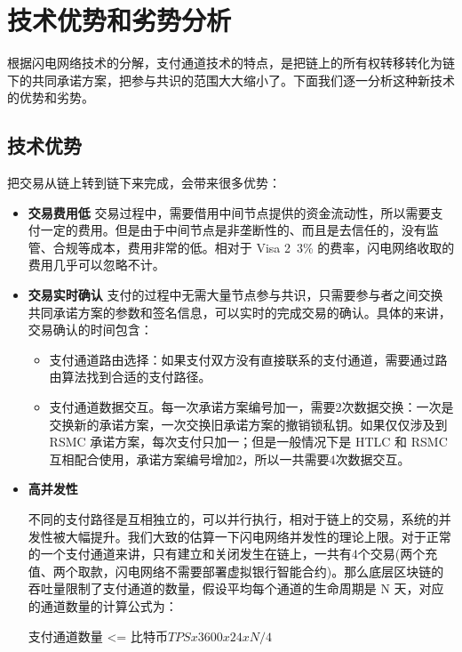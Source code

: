 \section{技术优势和劣势分析}
根据闪电网络技术的分解，支付通道技术的特点，是把链上的所有权转移转化为链下的共同承诺方案，把参与共识的范围大大缩小了。下面我们逐一分析这种新技术的优势和劣势。

\subsection{技术优势}
把交易从链上转到链下来完成，会带来很多优势：

\begin{itemize}
    \item  \textbf{交易费用低}
        交易过程中，需要借用中间节点提供的资金流动性，所以需要支付一定的费用。但是由于中间节点是非垄断性的、而且是去信任的，没有监管、合规等成本，费用非常的低。相对于 Visa 2~3\% 的费率，闪电网络收取的费用几乎可以忽略不计。
        
    \item \textbf{交易实时确认}
        支付的过程中无需大量节点参与共识，只需要参与者之间交换共同承诺方案的参数和签名信息，可以实时的完成交易的确认。具体的来讲，交易确认的时间包含：
        \begin{itemize}
            \item 支付通道路由选择：如果支付双方没有直接联系的支付通道，需要通过路由算法找到合适的支付路径。
            \item 支付通道数据交互。每一次承诺方案编号加一，需要2次数据交换：一次是交换新的承诺方案，一次交换旧承诺方案的撤销锁私钥。如果仅仅涉及到 RSMC 承诺方案，每次支付只加一；但是一般情况下是 HTLC 和 RSMC 互相配合使用，承诺方案编号增加2，所以一共需要4次数据交互。
            
        \end{itemize}
        

      \item \textbf{高并发性}

        不同的支付路径是互相独立的，可以并行执行，相对于链上的交易，系统的并发性被大幅提升。我们大致的估算一下闪电网络并发性的理论上限。对于正常的一个支付通道来讲，只有建立和关闭发生在链上，一共有4个交易(两个充值、两个取款，闪电网络不需要部署虚拟银行智能合约)。那么底层区块链的吞吐量限制了支付通道的数量，假设平均每个通道的生命周期是 N 天，对应的通道数量的计算公式为：

            支付通道数量 <= 比特币$TPS x 3600 x 24 x N / 4$
        

\end{itemize}

